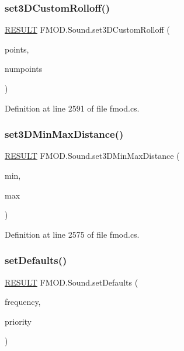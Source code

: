 \subsubsection{\texorpdfstring{set3\+D\+Custom\+Rolloff()}{set3DCustomRolloff()}}
{\footnotesize\ttfamily \hyperlink{namespace_f_m_o_d_a305d1176ef3f8c8815861a60407ac33d}{R\+E\+S\+U\+LT} F\+M\+O\+D.\+Sound.\+set3\+D\+Custom\+Rolloff (\begin{DoxyParamCaption}\item[{ref \hyperlink{struct_f_m_o_d_1_1_v_e_c_t_o_r}{V\+E\+C\+T\+OR}}]{points,  }\item[{int}]{numpoints }\end{DoxyParamCaption})}



Definition at line 2591 of file fmod.\+cs.

\mbox{\label{class_f_m_o_d_1_1_sound_a56eb46703dbbacf951e20f15fd0afa81}} 
\subsubsection{\texorpdfstring{set3\+D\+Min\+Max\+Distance()}{set3DMinMaxDistance()}}
{\footnotesize\ttfamily \hyperlink{namespace_f_m_o_d_a305d1176ef3f8c8815861a60407ac33d}{R\+E\+S\+U\+LT} F\+M\+O\+D.\+Sound.\+set3\+D\+Min\+Max\+Distance (\begin{DoxyParamCaption}\item[{float}]{min,  }\item[{float}]{max }\end{DoxyParamCaption})}



Definition at line 2575 of file fmod.\+cs.

\mbox{\label{class_f_m_o_d_1_1_sound_a6db1692dcaa21b55e874db24ac22ed83}} 
\subsubsection{\texorpdfstring{set\+Defaults()}{setDefaults()}}
{\footnotesize\ttfamily \hyperlink{namespace_f_m_o_d_a305d1176ef3f8c8815861a60407ac33d}{R\+E\+S\+U\+LT} F\+M\+O\+D.\+Sound.\+set\+Defaults (\begin{DoxyParamCaption}\item[{float}]{frequency,  }\item[{int}]{priority }\end{DoxyParamCaption})}



